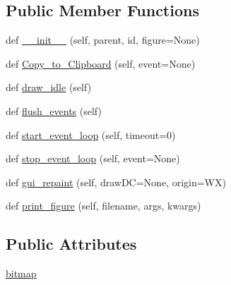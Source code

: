 \subsection*{Public Member Functions}
\begin{DoxyCompactItemize}
\item 
def \hyperlink{classmatplotlib_1_1backends_1_1backend__wx_1_1__FigureCanvasWxBase_abba326c6c83b25b4a23bdca1761eb3de}{\+\_\+\+\_\+init\+\_\+\+\_\+} (self, parent, id, figure=None)
\item 
def \hyperlink{classmatplotlib_1_1backends_1_1backend__wx_1_1__FigureCanvasWxBase_ac30fd47231a2c845d8716c6c22eb37e5}{Copy\+\_\+to\+\_\+\+Clipboard} (self, event=None)
\item 
def \hyperlink{classmatplotlib_1_1backends_1_1backend__wx_1_1__FigureCanvasWxBase_a2e8cb6dab8b656d6ba86d54cba74b7c4}{draw\+\_\+idle} (self)
\item 
def \hyperlink{classmatplotlib_1_1backends_1_1backend__wx_1_1__FigureCanvasWxBase_a4d70d13e5059160ad42c8135ecedd9bc}{flush\+\_\+events} (self)
\item 
def \hyperlink{classmatplotlib_1_1backends_1_1backend__wx_1_1__FigureCanvasWxBase_a8646c81951f3981c5ba0969c76ca7f1e}{start\+\_\+event\+\_\+loop} (self, timeout=0)
\item 
def \hyperlink{classmatplotlib_1_1backends_1_1backend__wx_1_1__FigureCanvasWxBase_a5aa519f0839089c90c891f4147655cc9}{stop\+\_\+event\+\_\+loop} (self, event=None)
\item 
def \hyperlink{classmatplotlib_1_1backends_1_1backend__wx_1_1__FigureCanvasWxBase_a63d10bc394beefee3ca36c933bd20a8f}{gui\+\_\+repaint} (self, draw\+DC=None, origin=\textquotesingle{}WX\textquotesingle{})
\item 
def \hyperlink{classmatplotlib_1_1backends_1_1backend__wx_1_1__FigureCanvasWxBase_a4487f1a5bcac8593c83e319b2c1217ab}{print\+\_\+figure} (self, filename, args, kwargs)
\end{DoxyCompactItemize}
\subsection*{Public Attributes}
\begin{DoxyCompactItemize}
\item 
\hyperlink{classmatplotlib_1_1backends_1_1backend__wx_1_1__FigureCanvasWxBase_ae915b1b1127698cf8faf24831bf4835a}{bitmap}
\end{DoxyCompactItemize}
